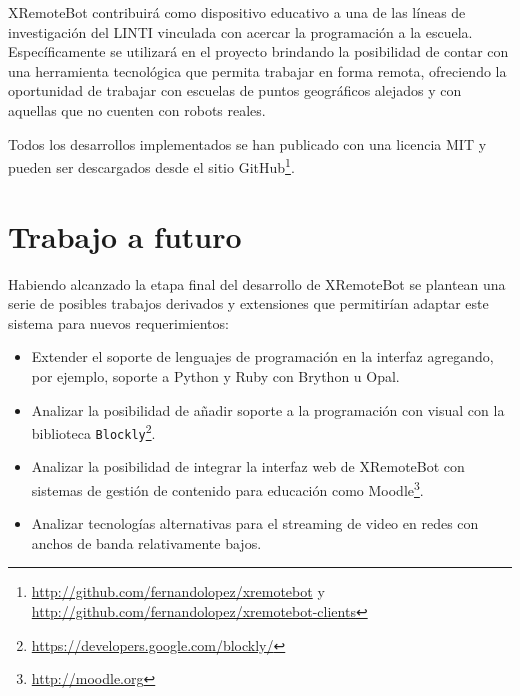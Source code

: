 XRemoteBot contribuirá como dispositivo educativo a una de las líneas
de investigación del LINTI vinculada con acercar la programación a la
escuela. Específicamente se utilizará en el proyecto \proyecto{} brindando
la posibilidad de contar con una herramienta tecnológica que permita
trabajar en forma remota, ofreciendo la oportunidad de trabajar con escuelas
de puntos geográficos alejados y con aquellas que no cuenten con robots
reales.

Todos los desarrollos implementados se han publicado con una licencia
MIT y pueden ser descargados desde el sitio
GitHub\footnote{\url{http://github.com/fernandolopez/xremotebot} y\\
\url{http://github.com/fernandolopez/xremotebot-clients}}.

\section{Trabajo a futuro}
Habiendo alcanzado la etapa final del desarrollo de XRemoteBot
se plantean una serie de
posibles trabajos derivados y extensiones que permitirían adaptar este
sistema para nuevos requerimientos:

\begin{itemize}
    \item Extender el soporte de lenguajes de programación en la interfaz
        agregando, por ejemplo, soporte a Python y Ruby con Brython u Opal.
    \item Analizar la posibilidad de añadir soporte a la programación con
        visual con la biblioteca
        \texttt{Blockly}\footnote{\url{https://developers.google.com/blockly/}}.
    \item Analizar la posibilidad de integrar la interfaz web de XRemoteBot con
        sistemas de gestión de contenido para educación como
        Moodle\footnote{\url{http://moodle.org}}.
    \item Analizar tecnologías alternativas para el streaming de video en
        redes con anchos de banda relativamente bajos.
\end{itemize}



